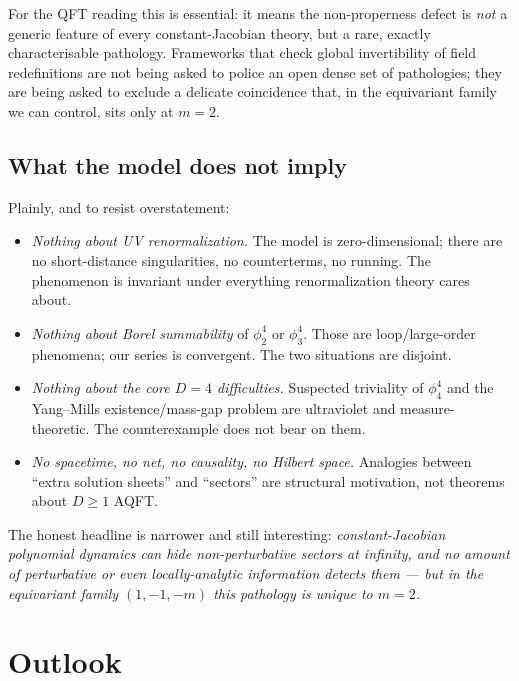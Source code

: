 \documentclass[11pt]{article}
\theoremstyle{definition}
\theoremstyle{remark}
\begin{document}
For the QFT reading this is essential: it means the non-properness
defect is \emph{not} a generic feature of every constant-Jacobian
theory, but a rare, exactly characterisable pathology. Frameworks that
check global invertibility of field redefinitions are not being asked
to police an open dense set of pathologies; they are being asked to
exclude a delicate coincidence that, in the equivariant family we can
control, sits only at $m=2$.

\subsection{What the model does not imply}

Plainly, and to resist overstatement:

\begin{itemize}
\item \emph{Nothing about UV renormalization.} The model is
 zero-dimensional; there are no short-distance singularities, no
 counterterms, no running. The phenomenon is invariant under everything
 renormalization theory cares about.
\item \emph{Nothing about Borel summability} of $\phi^4_2$ or
 $\phi^4_3$. Those are loop/large-order phenomena; our series is
 convergent. The two situations are disjoint.
\item \emph{Nothing about the core $D=4$ difficulties.} Suspected
 triviality of $\phi^4_4$ and the Yang--Mills existence/mass-gap
 problem are ultraviolet and measure-theoretic. The counterexample does
 not bear on them.
\item \emph{No spacetime, no net, no causality, no Hilbert space.}
 Analogies between ``extra solution sheets'' and ``sectors'' are
 structural motivation, not theorems about $D\ge 1$ AQFT.
\end{itemize}

The honest headline is narrower and still interesting:
\emph{constant-Jacobian polynomial dynamics can hide non-perturbative
sectors at infinity, and no amount of perturbative or even
locally-analytic information detects them --- but in the equivariant
family $(1,-1,-m)$ this pathology is unique to $m=2$.}

\section{Outlook}\label{sec:outlook}
\end{document}
